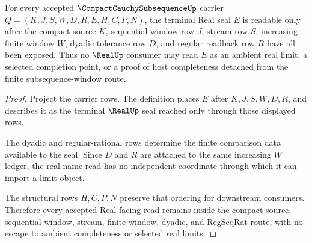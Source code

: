 \begin{theorem}
\label{thm:compact-cauchy-subsequence-real-seal-nonescape}
For every accepted $\CompactCauchySubsequenceUp$ carrier $Q=(K,J,S,W,D,R,E,H,C,P,N)$, the terminal Real seal $E$ is readable only after the compact source $K$, sequential-window row $J$, stream row $S$, increasing finite window $W$, dyadic tolerance row $D$, and regular readback row $R$ have all been exposed. Thus no $\RealUp$ consumer may read $E$ as an ambient real limit, a selected completion point, or a proof of host completeness detached from the finite subsequence-window route.
\end{theorem}
\begin{proof}
Project the carrier rows. The definition places $E$ after $K,J,S,W,D,R$, and describes it as the terminal $\RealUp$ seal reached only through those displayed rows.

The dyadic and regular-rational rows determine the finite comparison data available to the seal. Since $D$ and $R$ are attached to the same increasing $W$ ledger, the real-name read has no independent coordinate through which it can import a limit object.

The structural rows $H,C,P,N$ preserve that ordering for downstream consumers. Therefore every accepted Real-facing read remains inside the compact-source, sequential-window, stream, finite-window, dyadic, and RegSeqRat route, with no escape to ambient completeness or selected real limits.
\end{proof}


\begin{closurestatus}{\CompactCauchySubsequenceUp}
  \theoryclosure{\seedClosure}
  \formalstatus{\unformalizedV}
\end{closurestatus}
